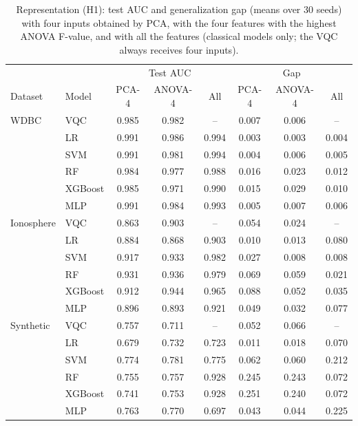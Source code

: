 \begin{table}[t]
\centering
\caption{Representation (H1): test AUC and generalization gap (means over 30 seeds) with four inputs obtained by PCA, with the four features with the highest ANOVA F-value, and with all the features (classical models only; the VQC always receives four inputs).}
\label{tab:h1}
\footnotesize
\setlength{\tabcolsep}{4pt}
\begin{tabular}{llcccccc}
\hline
 & & \multicolumn{3}{c}{Test AUC} & \multicolumn{3}{c}{Gap} \\
Dataset & Model & PCA-4 & ANOVA-4 & All & PCA-4 & ANOVA-4 & All \\
\hline
WDBC & VQC & 0.985 & 0.982 & -- & 0.007 & 0.006 & -- \\
 & LR & 0.991 & 0.986 & 0.994 & 0.003 & 0.003 & 0.004 \\
 & SVM & 0.991 & 0.981 & 0.994 & 0.004 & 0.006 & 0.005 \\
 & RF & 0.984 & 0.977 & 0.988 & 0.016 & 0.023 & 0.012 \\
 & XGBoost & 0.985 & 0.971 & 0.990 & 0.015 & 0.029 & 0.010 \\
 & MLP & 0.991 & 0.984 & 0.993 & 0.005 & 0.007 & 0.006 \\
\hline
Ionosphere & VQC & 0.863 & 0.903 & -- & 0.054 & 0.024 & -- \\
 & LR & 0.884 & 0.868 & 0.903 & 0.010 & 0.013 & 0.080 \\
 & SVM & 0.917 & 0.933 & 0.982 & 0.027 & 0.008 & 0.008 \\
 & RF & 0.931 & 0.936 & 0.979 & 0.069 & 0.059 & 0.021 \\
 & XGBoost & 0.912 & 0.944 & 0.965 & 0.088 & 0.052 & 0.035 \\
 & MLP & 0.896 & 0.893 & 0.921 & 0.049 & 0.032 & 0.077 \\
\hline
Synthetic & VQC & 0.757 & 0.711 & -- & 0.052 & 0.066 & -- \\
 & LR & 0.679 & 0.732 & 0.723 & 0.011 & 0.018 & 0.070 \\
 & SVM & 0.774 & 0.781 & 0.775 & 0.062 & 0.060 & 0.212 \\
 & RF & 0.755 & 0.757 & 0.928 & 0.245 & 0.243 & 0.072 \\
 & XGBoost & 0.741 & 0.753 & 0.928 & 0.251 & 0.240 & 0.072 \\
 & MLP & 0.763 & 0.770 & 0.697 & 0.043 & 0.044 & 0.225 \\
\hline
\end{tabular}
\end{table}

